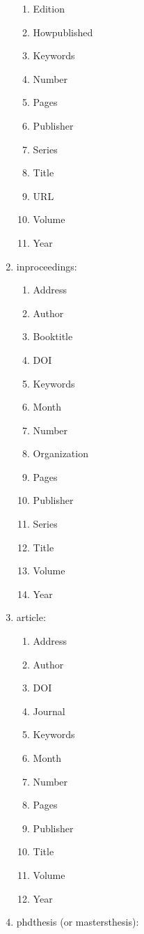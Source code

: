\documentclass[letter,12pt]{article}
\begin{document}
\begin{enumerate}
\begin{enumerate}
	\item Edition
	\item Howpublished
	\item Keywords
	\item Number
	\item Pages
	\item Publisher
	\item Series
	\item Title
	\item URL
	\item Volume
	\item Year
	\end{enumerate}
\item inproceedings: \vspace{-0.3cm}
	\begin{enumerate} \itemsep -2pt
	\item Address
	\item Author
	\item Booktitle
	\item DOI
	\item Keywords
	\item Month
	\item Number
	\item Organization
	\item Pages
	\item Publisher
	\item Series
	\item Title
	\item Volume
	\item Year
	\end{enumerate}
\item article: \vspace{-0.3cm}
	\begin{enumerate} \itemsep -2pt
	\item Address
	\item Author
	\item DOI
	\item Journal
	\item Keywords
	\item Month
	\item Number
	\item Pages
	\item Publisher
	\item Title
	\item Volume
	\item Year
	\end{enumerate}
\item phdthesis (or mastersthesis): \vspace{-0.3cm}

\end{enumerate}
\end{document}

